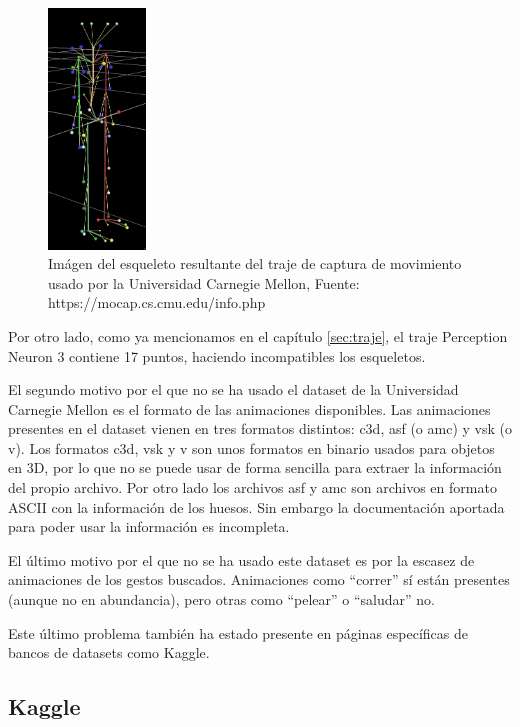 \begin{figure}[H]
    \centering
    \includegraphics[width=0.23\textwidth]{Imagenes/Bitmap/MCUEsqueleto.jpg}
    \caption{Imágen del esqueleto resultante del traje de captura de movimiento usado por la Universidad Carnegie Mellon, Fuente: https://mocap.cs.cmu.edu/info.php}
    \label{fig:MCUEsqueleto}
\end{figure}

Por otro lado, como ya mencionamos en el capítulo \ref{sec:traje}, el traje Perception Neuron 3 contiene 17 puntos, haciendo incompatibles los esqueletos.

El segundo motivo por el que no se ha usado el dataset de la Universidad Carnegie Mellon es el formato de las animaciones disponibles.
Las animaciones presentes en el dataset vienen en tres formatos distintos: c3d, asf (o amc) y vsk (o v).
Los formatos c3d, vsk y v son unos formatos en binario usados para objetos en 3D, por lo que no se puede usar de forma sencilla para extraer la información del propio archivo.
Por otro lado los archivos asf y amc son archivos en formato ASCII con la información de los huesos. Sin embargo la documentación aportada para poder usar la información es incompleta.

El último motivo por el que no se ha usado este dataset es por la escasez de animaciones de los gestos buscados.
Animaciones como ``correr'' sí están presentes (aunque no en abundancia), pero otras como ``pelear'' o ``saludar'' no.

Este último problema también ha estado presente en páginas específicas de bancos de datasets como Kaggle.

\subsection{Kaggle}

